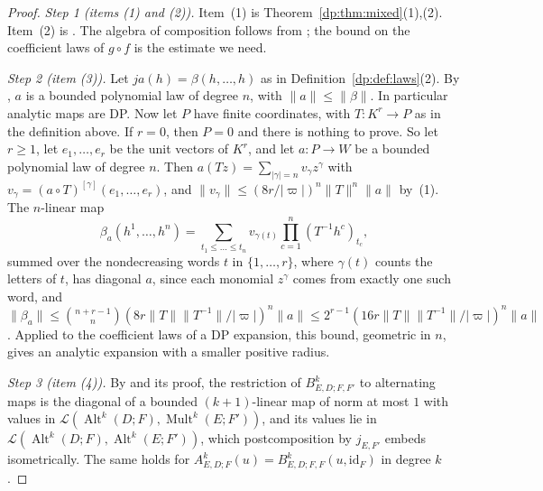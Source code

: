 \documentclass[11pt]{amsart}
\theoremstyle{definition}
\theoremstyle{remark}
\numberwithin{equation}{section}
\newcommand{\cL}{\mathcal L}
\newcommand{\Alt}{\operatorname{Alt}}
\newcommand{\Mult}{\operatorname{Mult}}
\newcommand{\id}{\mathrm{id}}
\newcommand{\abs}[1]{\lvert #1\rvert}
\newcommand{\norm}[1]{\lVert #1\rVert}
\theoremstyle{plain}
\theoremstyle{definition}
\theoremstyle{plain}
\begin{document}
\begin{proof}
\emph{Step 1 (items (1) and (2)).} Item~(1) is Theorem~\ref{dp:thm:mixed}(1),(2). Item~(2) is \cite[Lemma~Q.3]{I}. The algebra of composition follows from \cite[VI~\S8, Prop.~VI.6, Cor.; Prop.~I.2; II~\S1]{Ro}; the bound on the coefficient laws of $g\circ f$ is the estimate we need.

\emph{Step 2 (item (3)).} Let $ja(h)=\beta(h,\dots,h)$ as in Definition~\ref{dp:def:laws}(2). By \cite[Lemma~Q.1(3)]{I}, $a$ is a bounded polynomial law of degree $n$, with $\norm a\le\norm\beta$. In particular
analytic maps are DP. Now let $P$ have finite coordinates, with $T\colon K^r\to P$ as in the definition above. If $r=0$, then $P=0$ and there is nothing to prove. So let $r\ge1$, let $e_1,\dots,e_r$ be the unit vectors of $K^r$, and let $a\colon P\to W$ be a bounded polynomial law of degree $n$. Then
$a(Tz)=\sum_{\abs\gamma=n}v_\gamma z^\gamma$ with $v_\gamma=(a\circ T)^{[\gamma]}(e_1,\dots,e_r)$, and
$\norm{v_\gamma}\le(8r/\abs\varpi)^n\norm T^n\norm a$ by~(1). The $n$\nobreakdash-linear map
\[
 \beta_a(h^1,\dots,h^n)=\sum_{t_1\le\dots\le t_n}v_{\gamma(t)}\prod_{c=1}^n(T^{-1}h^c)_{t_c},
\]
summed over the nondecreasing words $t$ in $\{1,\dots,r\}$, where $\gamma(t)$ counts the letters of $t$, has diagonal
$a$, since each monomial $z^\gamma$ comes from exactly one such word, and
$\norm{\beta_a}\le\binom{n+r-1}n(8r\norm T\norm{T^{-1}}/\abs\varpi)^n\norm a\le2^{r-1}(16r\norm T\norm{T^{-1}}/\abs\varpi)^n\norm a$.
Applied to the coefficient laws of a DP expansion, this bound, geometric in $n$, gives an analytic expansion with a
smaller positive radius.

\emph{Step 3 (item (4)).} By \cite[Proposition~2.2]{I} and its proof, the restriction of $B^k_{E,D;F,F'}$ to
alternating maps is the diagonal of a bounded $(k+1)$\nobreakdash-linear map of norm at most $1$ with values in
$\cL(\Alt^k(D;F),\Mult^k(E;F'))$, and its values lie in $\cL(\Alt^k(D;F),\Alt^k(E;F'))$, which postcomposition by
$j_{E,F'}$ embeds isometrically. The same holds for $A^k_{E,D;F}(u)=B^k_{E,D;F,F}(u,\id_F)$ in degree $k$.


\end{proof}
\end{document}
